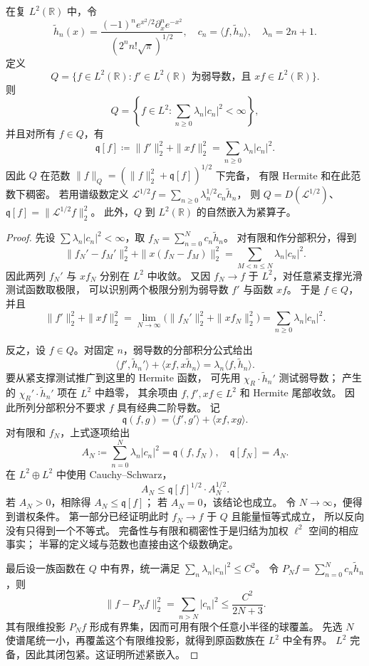 \begin{proposition}[谐振子的二次型域]\label{b2:prop:B2-oscillator-form}
在复 \(L^2(\mathbb R)\) 中，令
\[
 \widetilde h_n(x)=
 \frac{(-1)^ne^{x^2/2}\partial_x^ne^{-x^2}}
 {(2^nn!\sqrt\pi)^{1/2}},
 \quad
 c_n=\langle f,\widetilde h_n\rangle,\quad \lambda_n=2n+1.
\]
定义
\[
 Q=\{f\in L^2(\mathbb R):
 f'\in L^2(\mathbb R)\text{ 为弱导数，且 }xf\in L^2(\mathbb R)\}.
\]
则
\[
 Q=\left\{f\in L^2:
 \sum_{n\geq0}\lambda_n|c_n|^2<\infty\right\},
\]
并且对所有 \(f\in Q\)，有
\[
 \mathfrak q[f]\coloneqq\|f'\|_2^2+\|xf\|_2^2
 =\sum_{n\geq0}\lambda_n|c_n|^2.
\]
因此 \(Q\) 在范数
\(\|f\|_Q=(\|f\|_2^2+\mathfrak q[f])^{1/2}\) 下完备，
有限 Hermite 和在此范数下稠密。
若用谱级数定义
\(\mathcal L^{1/2}f=\sum_{n\geq0}\lambda_n^{1/2}c_n\widetilde h_n\)，
则 \(Q=D(\mathcal L^{1/2})\)、\(\mathfrak q[f]=\|\mathcal L^{1/2}f\|_2^2\)。
此外，\(Q\) 到 \(L^2(\mathbb R)\) 的自然嵌入为紧算子。
\end{proposition}
\begin{proof}
先设 \(\sum\lambda_n|c_n|^2<\infty\)，取
\(f_N=\sum_{n=0}^Nc_n\widetilde h_n\)。
对有限和作分部积分，得到
\[
 \|f_N'-f_M'\|_2^2+\|x(f_N-f_M)\|_2^2
 =\sum_{M<n\leq N}\lambda_n|c_n|^2.
\]
因此两列 \(f_N'\) 与 \(xf_N\) 分别在 \(L^2\) 中收敛。
又因 \(f_N\to f\) 于 \(L^2\)，对任意紧支撑光滑测试函数取极限，
可以识别两个极限分别为弱导数 \(f'\) 与函数 \(xf\)。
于是 \(f\in Q\)，并且
\[
 \|f'\|_2^2+\|xf\|_2^2
 =\lim_{N\to\infty}
 \bigl(\|f_N'\|_2^2+\|xf_N\|_2^2\bigr)
 =\sum_{n\geq0}\lambda_n|c_n|^2.
\]

反之，设 \(f\in Q\)。对固定 \(n\)，弱导数的分部积分公式给出
\[
 \langle f',\widetilde h_n'\rangle
 +\langle xf,x\widetilde h_n\rangle
 =\lambda_n\langle f,\widetilde h_n\rangle.
\]
要从紧支撑测试推广到这里的 Hermite 函数，
可先用 \(\chi_R\cdot\widetilde h_n'\) 测试弱导数；
产生的 \(\chi_R'\cdot\widetilde h_n'\) 项在 \(L^2\) 中趋零，
其余项由 \(f,f',xf\in L^2\) 和 Hermite 尾部收敛。
因此所列分部积分不要求 \(f\) 具有经典二阶导数。
记
\[
 \mathfrak q(f,g)=
 \langle f',g'\rangle+\langle xf,xg\rangle.
\]
对有限和 \(f_N\)，上式逐项给出
\[
 A_N\coloneqq\sum_{n=0}^N\lambda_n|c_n|^2
 =\mathfrak q(f,f_N),\quad
 \mathfrak q[f_N]=A_N.
\]
在 \(L^2\oplus L^2\) 中使用 Cauchy--Schwarz，
\[
 A_N\leq\mathfrak q[f]^{1/2}\cdot A_N^{1/2}.
\]
若 \(A_N>0\)，相除得 \(A_N\leq\mathfrak q[f]\)；
若 \(A_N=0\)，该结论也成立。
令 \(N\to\infty\)，便得到谱权条件。
第一部分已经证明此时 \(f_N\to f\) 于 \(Q\) 且能量恒等式成立，
所以反向没有只得到一个不等式。
完备性与有限和稠密性于是归结为加权 \(\ell^2\) 空间的相应事实；
半幂的定义域与范数也直接由这个级数确定。

最后设一族函数在 \(Q\) 中有界，统一满足
\(\sum_n\lambda_n|c_n|^2\leq C^2\)。
令 \(P_Nf=\sum_{n=0}^Nc_n\widetilde h_n\)，则
\[
 \|f-P_Nf\|_2^2
 =\sum_{n>N}|c_n|^2
 \leq\frac{C^2}{2N+3}.
\]
其有限维投影 \(P_Nf\) 形成有界集，因而可用有限个任意小半径的球覆盖。
先选 \(N\) 使谱尾统一小，再覆盖这个有限维投影，就得到原函数族在 \(L^2\) 中全有界。
\(L^2\) 完备，因此其闭包紧。这证明所述紧嵌入。
\end{proof}

